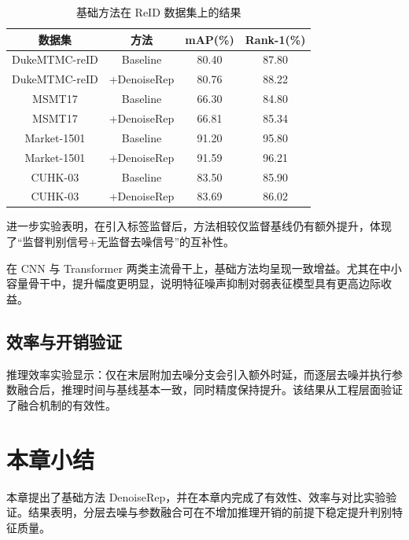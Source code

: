 \begin{table}[!htb]
\centering
\caption{基础方法在 ReID 数据集上的结果}
\label{tab:base-reid}
\small
\begin{tabular}{|c|c|c|c|}
\hline
数据集 & 方法 & mAP(\%) & Rank-1(\%) \\
\hline
DukeMTMC-reID & Baseline & 80.40 & 87.80 \\
DukeMTMC-reID & +DenoiseRep & 80.76 & 88.22 \\
\hline
MSMT17 & Baseline & 66.30 & 84.80 \\
MSMT17 & +DenoiseRep & 66.81 & 85.34 \\
\hline
Market-1501 & Baseline & 91.20 & 95.80 \\
Market-1501 & +DenoiseRep & 91.59 & 96.21 \\
\hline
CUHK-03 & Baseline & 83.50 & 85.90 \\
CUHK-03 & +DenoiseRep & 83.69 & 86.02 \\
\hline
\end{tabular}
\end{table}

进一步实验表明，在引入标签监督后，方法相较仅监督基线仍有额外提升，体现了“监督判别信号+无监督去噪信号”的互补性。

在 CNN 与 Transformer 两类主流骨干上，基础方法均呈现一致增益。尤其在中小容量骨干中，提升幅度更明显，说明特征噪声抑制对弱表征模型具有更高边际收益。

\subsection{效率与开销验证}
推理效率实验显示：仅在末层附加去噪分支会引入额外时延，而逐层去噪并执行参数融合后，推理时间与基线基本一致，同时精度保持提升。该结果从工程层面验证了融合机制的有效性。

\section{本章小结}
本章提出了基础方法 DenoiseRep，并在本章内完成了有效性、效率与对比实验验证。结果表明，分层去噪与参数融合可在不增加推理开销的前提下稳定提升判别特征质量。

